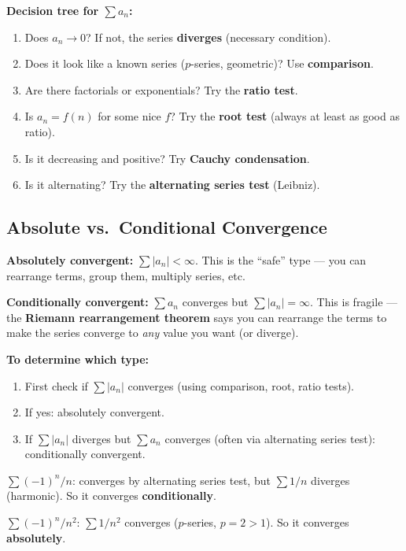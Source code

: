 \documentclass[11pt]{article}
\theoremstyle{definition}
\begin{document}
\begin{application}
\textbf{Decision tree for $\sum a_n$:}
\begin{enumerate}
\item Does $a_n \to 0$? If not, the series \textbf{diverges} (necessary condition).
\item Does it look like a known series ($p$-series, geometric)? Use \textbf{comparison}.
\item Are there factorials or exponentials? Try the \textbf{ratio test}.
\item Is $a_n = f(n)$ for some nice $f$? Try the \textbf{root test} (always at least as good as ratio).
\item Is it decreasing and positive? Try \textbf{Cauchy condensation}.
\item Is it alternating? Try the \textbf{alternating series test} (Leibniz).
\end{enumerate}
\end{application}

\subsection{Absolute vs.\ Conditional Convergence}

\textbf{Absolutely convergent:} $\sum |a_n| < \infty$. This is the ``safe'' type --- you can rearrange terms, group them, multiply series, etc.

\textbf{Conditionally convergent:} $\sum a_n$ converges but $\sum |a_n| = \infty$. This is fragile --- the \textbf{Riemann rearrangement theorem} says you can rearrange the terms to make the series converge to \textit{any} value you want (or diverge).

\begin{application}
\textbf{To determine which type:}
\begin{enumerate}
\item First check if $\sum |a_n|$ converges (using comparison, root, ratio tests).
\item If yes: absolutely convergent.
\item If $\sum |a_n|$ diverges but $\sum a_n$ converges (often via alternating series test): conditionally convergent.
\end{enumerate}
\end{application}

\begin{example}
$\sum (-1)^n / n$: converges by alternating series test, but $\sum 1/n$ diverges (harmonic). So it converges \textbf{conditionally}.

$\sum (-1)^n / n^2$: $\sum 1/n^2$ converges ($p$-series, $p = 2 > 1$). So it converges \textbf{absolutely}.
\end{example}
\end{document}
